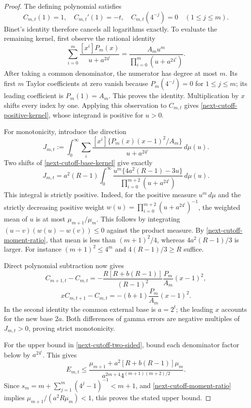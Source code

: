 \documentclass[11pt,a4paper]{article}
\theoremstyle{definition}
\theoremstyle{remark}
\begin{document}
\begin{proof}
The defining polynomial satisfies
\[
 C_{m,t}(1)=1,\quad C_{m,t}'(1)=-t,\quad
 C_{m,t}(4^{-j})=0\quad(1\le j\le m).
\]
Binet's identity therefore cancels all logarithms exactly. To evaluate the
remaining kernel, first observe the rational identity
\begin{equation}\label{next-cutoff-base-kernel}
 \sum_{i=0}^m\frac{[x^i]P_m(x)}{u+a^24^i}
 =\frac{A_m u^m}{\prod_{i=0}^m(u+a^24^i)}.
\end{equation}
After taking a common denominator, the numerator has degree at most $m$.
Its first $m$ Taylor coefficients at zero vanish because
$P_m(4^{-j})=0$ for $1\le j\le m$; its leading coefficient is
$P_m(1)=A_m$. This proves the identity. Multiplication by $x$ shifts every
index by one. Applying this observation to $C_{m,t}$ gives
\eqref{next-cutoff-positive-kernel}, whose integrand is positive for $u>0$.

For monotonicity, introduce the direction
\[
 J_{m,t}:=\int_0^\infty
 \sum_i\frac{[x^i]\{P_m(x)(x-1)^2/A_m\}}{u+a^24^i}\,d\mu(u).
\]
Two shifts of \eqref{next-cutoff-base-kernel} give exactly
\begin{equation}\label{next-cutoff-direction}
 J_{m,t}
 =a^2(R-1)\int_0^\infty
 \frac{u^m\{4a^2(R-1)-3u\}}
      {\prod_{i=0}^{m+2}(u+a^24^i)}\,d\mu(u).
\end{equation}
This integral is strictly positive. Indeed, for the positive measure
$u^m\,d\mu$ and the strictly decreasing positive weight
$w(u)=\prod_{i=0}^{m+2}(u+a^24^i)^{-1}$, the weighted mean of $u$ is at
most $\mu_{m+1}/\mu_m$. This follows by integrating
$(u-v)(w(u)-w(v))\le0$ against the product measure. By
\eqref{next-cutoff-moment-ratio}, that mean is less than $(m+1)^2/4$,
whereas $4a^2(R-1)/3$ is larger. For instance $(m+1)^2\le4^m$ and
$4(R-1)/3\ge R$ suffice.

Direct polynomial subtraction now gives
\[
 C_{m+1,t}-C_{m,t}
 =-\frac{R[R+b(R-1)]}{(R-1)^2}
        \frac{P_m}{A_m}(x-1)^2,
\]
\[
 xC_{m,t+1}-C_{m,t}
 =-(b+1)\frac{P_m}{A_m}(x-1)^2.
\]
In the second identity the common external base is $a=2^t$; the leading
$x$ accounts for the new base $2a$. Both differences of gamma errors
are negative multiples of $J_{m,t}>0$, proving strict monotonicity.

For the upper bound in \eqref{next-cutoff-two-sided}, bound each
denominator factor below by $a^24^i$. This gives
\[
 E_{m,t}\le
 \frac{\mu_{m+1}+a^2[R+b(R-1)]\mu_m}
 {a^{2m+4}4^{(m+1)(m+2)/2}}.
\]
Since
$s_m=m+\sum_{j=1}^m(4^j-1)^{-1}<m+1$,
and \eqref{next-cutoff-moment-ratio} implies
$\mu_{m+1}/(a^2R\mu_m)<1$, this proves the stated upper bound.


\end{proof}
\end{document}
